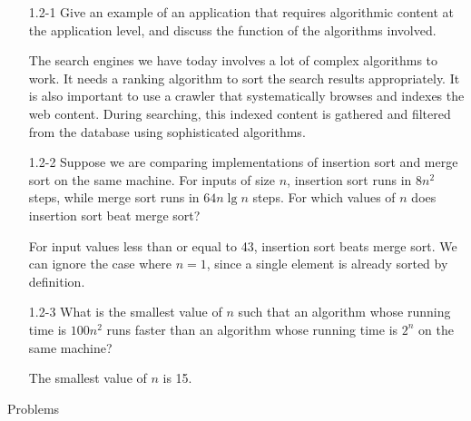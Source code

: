 \begin{enumerate}

\item[1.2{-}1] Give an example of an application that requires
  algorithmic content at the application level, and discuss the function of the
  algorithms involved.

\begin{framed}
The search engines we have today involves a lot of complex algorithms to work.
It needs a ranking algorithm to sort the search results appropriately. It is
also important to use a crawler that systematically browses and indexes the web
content. During searching, this indexed content is gathered and filtered from
the database using sophisticated algorithms.
\end{framed}

\item[1.2{-}2] Suppose we are comparing implementations of insertion
  sort and merge sort on the same machine. For inputs of size $n$, insertion sort
  runs in $8 n^2$ steps, while merge sort runs in $64 n \lg n$ steps. For which
  values of $n$ does insertion sort beat merge sort?

\begin{framed}
For input values less than or equal to 43, insertion sort beats merge sort. We
can ignore the case where $n = 1$, since a single element is already sorted by
definition.
\end{framed}

\item[1.2{-}3] What is the smallest value of $n$ such that an algorithm
  whose running time is $100 n^2$ runs faster than an algorithm whose running
  time is $2^n$ on the same machine?

\begin{framed}
The smallest value of $n$ is 15.
\end{framed}

\end{enumerate}

\pagebreak

{\large Problems}

